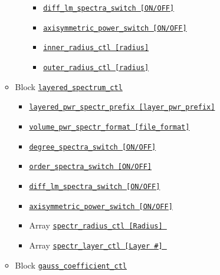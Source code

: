 \begin{itemize}
\begin{itemize}
\begin{itemize}
\begin{itemize}
			\item \hyperref[href_t:diff_lm_spectra_switch]
				{\tt diff\_lm\_spectra\_switch           [ON/OFF]}
			\item \hyperref[href_t:axisymmetric_power_switch]
				{\tt axisymmetric\_power\_switch           [ON/OFF]}
%
			\item \hyperref[href_t:inner_radius_ctl]
				{\tt inner\_radius\_ctl           [radius]}
			\item \hyperref[href_t:outer_radius_ctl]
				{\tt outer\_radius\_ctl           [radius]}
			\end{itemize}
		\end{itemize}
%
	\item Block \hyperref[href_t:layered_spectrum_ctl]{\tt layered\_spectrum\_ctl}
		\begin{itemize}
		\item \hyperref[href_t:layered_pwr_spectr_prefix]
				{\tt layered\_pwr\_spectr\_prefix         [layer\_pwr\_prefix]}
	       	\item \hyperref[href_t:layered_pwr_spectr_format]
		    	{\tt volume\_pwr\_spectr\_format    [file\_format]}
%
		\item \hyperref[href_t:degree_spectra_switch]
			{\tt degree\_spectra\_switch           [ON/OFF]}
		\item \hyperref[href_t:order_spectra_switch]
			{\tt order\_spectra\_switch           [ON/OFF]}
		\item \hyperref[href_t:diff_lm_spectra_switch]
			{\tt diff\_lm\_spectra\_switch           [ON/OFF]}
		\item \hyperref[href_t:axisymmetric_power_switch]
			{\tt axisymmetric\_power\_switch           [ON/OFF]}
%
		\item Array \hyperref[href_t:spectr_radius_ctl]
				{\tt spectr\_radius\_ctl [Radius] }
		\item Array \hyperref[href_t:spectr_layer_ctl]
				{\tt spectr\_layer\_ctl [Layer \#] }
		\end{itemize}
%
	\item Block \hyperref[href_t:gauss_coefficient_ctl]{\tt gauss\_coefficient\_ctl}
\end{itemize}
\end{itemize}
